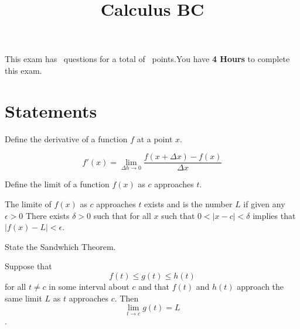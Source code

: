 

\usepackage{color}
\lstset{numbers=left}


\printanswers

\title{Calculus BC}
\maketitle



\begin{center}
    This exam has \numquestions\ questions for a total of \numpoints\
    points.You have {\bf 4 Hours} to complete this exam.
\end{center}


\section{Statements}
\begin{questions}
    \question[1] Define the derivative of a function $f$ at a point $x$.
    \begin{solution}
        $$f'(x) = \lim_{\Delta h \to 0} \frac{f(x + \Delta x) -
          f(x)}{\Delta x}$$
    \end{solution}

    \question[1] Define the limit of a function $f(x)$ as $c$ approaches
    $t$.
    \begin{solution}%
        \begin{definition} The limite of $f(x)$ as $c$ approaches $t$
        exists and is the number $L$ if given any $\epsilon > 0$ There
        exists $\delta > 0$ such that for all $x$ such that $0 < | x -
        c| < \delta$ implies that $|f(x) - L| < \epsilon$.
        \end{definition}
   
    \end{solution}
    \question[1] State the Sandwhich Theorem.
    \begin{solution}

        \begin{theorem} Suppose that $$f(t) \le g(t) \le h(t)$$ for
        all $t \ne c$ in some interval about $c$ and that $f(t)$ and
        $h(t)$ approach the same limit $L$ as $t$ approaches
        $c$. Then $$\lim_{t \to c} g(t) = L$$.
        \end{theorem}
    \end{solution}
\end{questions}

